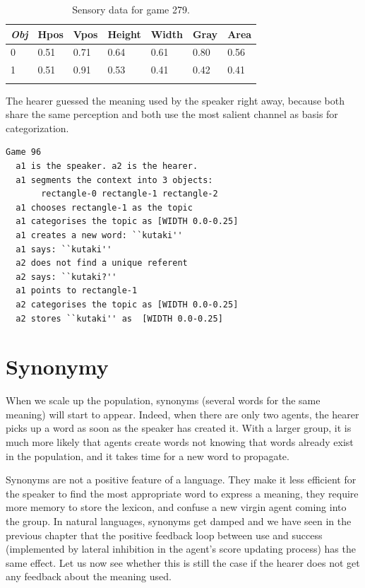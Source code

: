 \begin{table}
\begin{center}
\begin{tabular}{ l  l  l  l  l  l  l }
\lsptoprule
{\itshape Obj}&Hpos&Vpos&Height&Width&Gray&Area \\ \midrule
0 &0.51 & 0.71 & 0.64 & 0.61 & 0.80 & 0.56\\ 
1 & 0.51 & 0.91 & 0.53 & 0.41 & 0.42 & 0.41 \\ 
\lspbottomrule
\end{tabular}
\caption{\label{tab:279} Sensory data for game 279.}
\end{center}
\end{table}
The hearer guessed the meaning used
by the speaker right away, because both 
share the same perception and both use the most 
salient channel as basis for categorization. 
\begin{verbatim}
Game 96
  a1 is the speaker. a2 is the hearer. 
  a1 segments the context into 3 objects: 
       rectangle-0 rectangle-1 rectangle-2
  a1 chooses rectangle-1 as the topic 
  a1 categorises the topic as [WIDTH 0.0-0.25]
  a1 creates a new word: ``kutaki''
  a1 says: ``kutaki''
  a2 does not find a unique referent
  a2 says: ``kutaki?''
  a1 points to rectangle-1
  a2 categorises the topic as [WIDTH 0.0-0.25]
  a2 stores ``kutaki'' as  [WIDTH 0.0-0.25]
\end{verbatim}

\section{Synonymy}

When we scale up the population, synonyms (several words
for the same meaning) will start to appear. Indeed,
when there are only two agents, the hearer picks 
up a word as soon as the speaker has created it. With a larger
group, it is much more likely that agents create words
not knowing that words already exist in the population, and 
it takes time for a new word to propagate. 

Synonyms are not a positive feature of a language. They make 
it less efficient for the speaker to find the most 
appropriate word to express a meaning, they require more
memory to store the lexicon, and confuse a new virgin 
agent coming into the group. In natural languages, synonyms get
damped and we have seen in the previous chapter
that the positive feedback loop between 
use and success (implemented by lateral inhibition
in the agent's score updating process) has the same
effect. Let us now see whether this is still the 
case if the hearer does not get any feedback about the
meaning used. 


